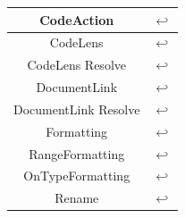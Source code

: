 \begin{figure}[H]
\begin{tabular}{|c|c|}
\hline
CodeAction & $\hookleftarrow$ \\
\hline
CodeLens & $\hookleftarrow$ \\
\hline
CodeLens Resolve & $\hookleftarrow$ \\
\hline
DocumentLink & $\hookleftarrow$ \\
\hline
DocumentLink Resolve & $\hookleftarrow$ \\
\hline
Formatting & $\hookleftarrow$ \\
\hline
RangeFormatting & $\hookleftarrow$ \\
\hline
OnTypeFormatting & $\hookleftarrow$ \\
\hline
Rename & $\hookleftarrow$ \\
\hline
\end{tabular}
\end{figure}


